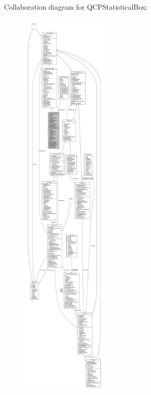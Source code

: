 Collaboration diagram for Q\+C\+P\+Statistical\+Box\+:\nopagebreak
\begin{figure}[H]
\begin{center}
\leavevmode
\includegraphics[height=550pt]{class_q_c_p_statistical_box__coll__graph}
\end{center}
\end{figure}
